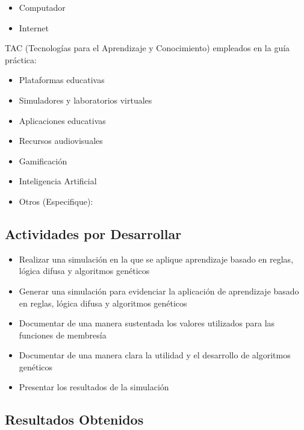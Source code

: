 \documentclass[11pt]{article}
\begin{document}
\begin{itemize}
    \item Computador
    \item Internet
\end{itemize}

TAC (Tecnolog\'ias para el Aprendizaje y Conocimiento) empleados en la gu\'ia pr\'actica:

\begin{itemize}[label=$\square$]
    \item Plataformas educativas
    \item Simuladores y laboratorios virtuales
    \item Aplicaciones educativas
    \item Recursos audiovisuales
    \item Gamificaci\'on
    \item[$\boxtimes$] Inteligencia Artificial
    \item Otros (Especifique): \underline{\hspace{5cm}}
\end{itemize}

\subsection{Actividades por Desarrollar}

\begin{itemize}
    \item Realizar una simulaci\'on en la que se aplique aprendizaje basado en reglas, l\'ogica difusa y algoritmos gen\'eticos
    \item Generar una simulaci\'on para evidenciar la aplicaci\'on de aprendizaje basado en reglas, l\'ogica difusa y algoritmos gen\'eticos
    \item Documentar de una manera sustentada los valores utilizados para las funciones de membres\'ia
    \item Documentar de una manera clara la utilidad y el desarrollo de algoritmos gen\'eticos
    \item Presentar los resultados de la simulaci\'on
\end{itemize}

\subsection{Resultados Obtenidos}
\end{document}
